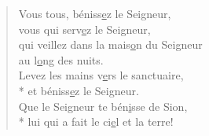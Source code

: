 
\begin{verse}
Vous tous, béniss\underline{e}z le Seigneur, \\
vous qui serv\underline{e}z le Seigneur, \\
qui veillez dans la mais\underline{o}n du Seigneur \\
au l\underline{o}ng des nuits. \\

Levez les mains v\underline{e}rs le sanctuaire, \\*
et béniss\underline{e}z le Seigneur. \\
Que le Seigneur te bén\underline{i}sse de Sion, \\*
lui qui a fait le ci\underline{e}l et la terre! \\
\end{verse}

